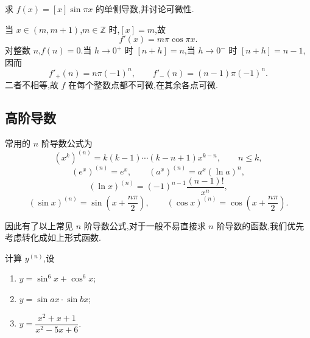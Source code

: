 \begin{example}
    求 $f(x)=[x]\sin\pi x$ 的单侧导数,并讨论可微性.
\end{example}
\exampleblank

\begin{solution}
    当 $x\in(m,m+1)$,$m\in\mathbb{Z}$ 时,$[x]=m$,故
    \[
        f'(x)=m\pi\cos\pi x.
    \]
    对整数 $n$,$f(n)=0$.当 $h\to0^+$ 时 $[n+h]=n$,当 $h\to0^-$ 时 $[n+h]=n-1$,因而
    \[
        f'_+(n)=n\pi(-1)^n,
        \qquad
        f'_-(n)=(n-1)\pi(-1)^n.
    \]
    二者不相等,故 $f$ 在每个整数点都不可微,在其余各点可微.
\end{solution}



\subsection{高阶导数}



\begin{theorem}[\markstar]
    常用的 $n$ 阶导数公式为
    \[
        (x^k)^{(n)}=k(k-1)\cdots(k-n+1)x^{k-n},
        \qquad n\leq k,
    \]
    \[
        (e^x)^{(n)}=e^x,
        \qquad
        (a^x)^{(n)}=a^x(\ln a)^n,
    \]
    \[
        (\ln x)^{(n)}=(-1)^{n-1}\dfrac{(n-1)!}{x^n},
    \]
    \[
        (\sin x)^{(n)}=\sin\left(x+\dfrac{n\pi}{2}\right),
        \qquad
        (\cos x)^{(n)}=\cos\left(x+\dfrac{n\pi}{2}\right).
    \]
\end{theorem}

\begin{remark}
    因此有了以上常见 $n$ 阶导数公式,对于一般不易直接求 $n$ 阶导数的函数,我们优先考虑转化成如上形式函数.
\end{remark}

\begin{example}
    计算 $y^{(n)}$,设
    \begin{enumerate}
        \item $y=\sin^6x+\cos^6x$;
        \item $y=\sin ax\cdot\sin bx$;
        \item $y=\dfrac{x^2+x+1}{x^2-5x+6}$.
    \end{enumerate}
\end{example}
\exampleblank

